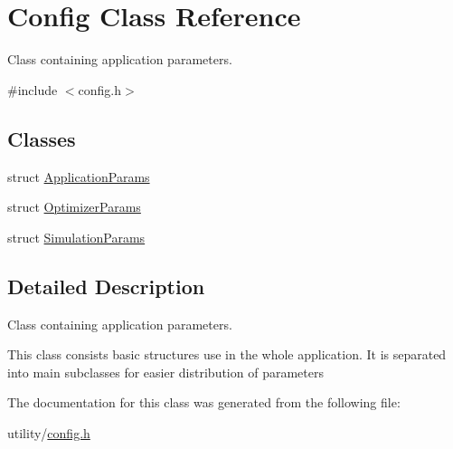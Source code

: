 \hypertarget{class_config}{}\section{Config Class Reference}
\label{class_config}


Class containing application parameters.  




{\ttfamily \#include $<$config.\+h$>$}

\subsection*{Classes}
\begin{DoxyCompactItemize}
\item 
struct \hyperlink{struct_config_1_1_application_params}{Application\+Params}
\item 
struct \hyperlink{struct_config_1_1_optimizer_params}{Optimizer\+Params}
\item 
struct \hyperlink{struct_config_1_1_simulation_params}{Simulation\+Params}
\end{DoxyCompactItemize}


\subsection{Detailed Description}
Class containing application parameters. 

This class consists basic structures use in the whole application. It is separated into main subclasses for easier distribution of parameters 

The documentation for this class was generated from the following file\+:\begin{DoxyCompactItemize}
\item 
utility/\hyperlink{config_8h}{config.\+h}\end{DoxyCompactItemize}
